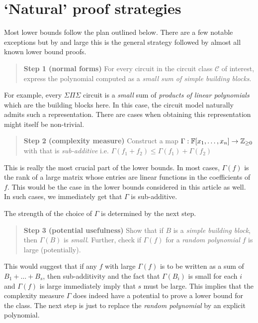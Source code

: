 \documentclass[12pt]{report}
\begin{document}
\section{`Natural' proof strategies}\label{sec:natural-proofs}

Most lower bounds follow the plan outlined below. There are a few notable exceptions but by and large this is the general strategy followed by almost all known lower bound proofs. 

\begin{quote}
{\bf Step 1 (normal forms)} For every circuit in the circuit class $\mathcal{C}$ of interest, express the polynomial computed as a \emph{small sum of simple building blocks}. 
\end{quote}

For example, every $\Sigma\Pi\Sigma$ circuit is a \emph{small} sum of \emph{products of linear polynomials} which are the building blocks here. In this case, the circuit model naturally admits such a representation. There are cases when obtaining this representation might itself be non-trivial. 

\begin{quote}
{\bf Step 2 (complexity measure)} Construct a map $\Gamma: \mathbb{F}[x_1,\dots, x_n] \rightarrow \mathbb{Z}_{\geq 0}$ with that is \emph{sub-additive} i.e. $\Gamma(f_1 + f_2)\leq \Gamma(f_1) + \Gamma(f_2)$
\end{quote}

This is really the most crucial part of the lower bounds. In most cases, $\Gamma(f)$ is the rank of a large matrix whose entries are linear functions in the coefficients of $f$. This would be the case in the lower bounds considered in this article as well. In such cases, we immediately get that $\Gamma$ is sub-additive. 

The strength of the choice of $\Gamma$ is determined by the next step. 

\begin{quote}
{\bf Step 3 (potential usefulness)} Show that if $B$ is a \emph{simple building block}, then $\Gamma(B)$ is \emph{small}.
Further, check if $\Gamma(f)$ for a \emph{random polynomial} $f$ is large (potentially). 
\end{quote}

This would suggest that if any $f$ with large $\Gamma(f)$ is to be written as a sum of $B_1 + \dots + B_s$, then sub-additivity and the fact that $\Gamma(B_i)$ is small for each $i$ and $\Gamma(f)$ is large immediately imply that $s$ must be large. This implies that the complexity measure $\Gamma$ does indeed have a potential to prove a lower bound for the class. The next step is just to replace the \emph{random polynomial} by an explicit polynomial. 
\end{document}
